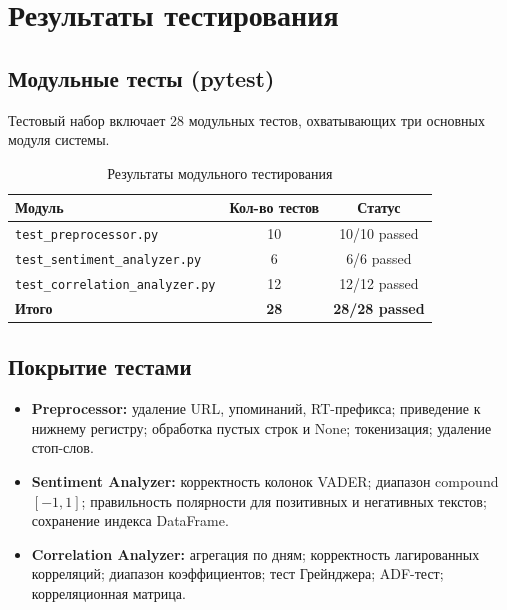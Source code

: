 \documentclass[a4paper,12pt]{article}
\begin{document}

\section{Результаты тестирования}

\subsection{Модульные тесты (pytest)}

Тестовый набор включает 28 модульных тестов, охватывающих три основных модуля системы.

\begin{table}[H]
\centering
\caption{Результаты модульного тестирования}
\label{tab:test_results}
\begin{tabular}{|l|c|c|}
\hline
\textbf{Модуль} & \textbf{Кол-во тестов} & \textbf{Статус} \\
\hline
\texttt{test\_preprocessor.py} & 10 & 10/10 passed \\
\hline
\texttt{test\_sentiment\_analyzer.py} & 6 & 6/6 passed \\
\hline
\texttt{test\_correlation\_analyzer.py} & 12 & 12/12 passed \\
\hline
\textbf{Итого} & \textbf{28} & \textbf{28/28 passed} \\
\hline
\end{tabular}
\end{table}

\subsection{Покрытие тестами}

\begin{itemize}
  \item \textbf{Preprocessor:} удаление URL, упоминаний, RT-префикса; приведение к нижнему
        регистру; обработка пустых строк и None; токенизация; удаление стоп-слов.
  \item \textbf{Sentiment Analyzer:} корректность колонок VADER; диапазон compound
        $[-1, 1]$; правильность полярности для позитивных и негативных текстов;
        сохранение индекса DataFrame.
  \item \textbf{Correlation Analyzer:} агрегация по дням; корректность лагированных
        корреляций; диапазон коэффициентов; тест Грейнджера; ADF-тест;
        корреляционная матрица.
\end{itemize}
\end{document}
